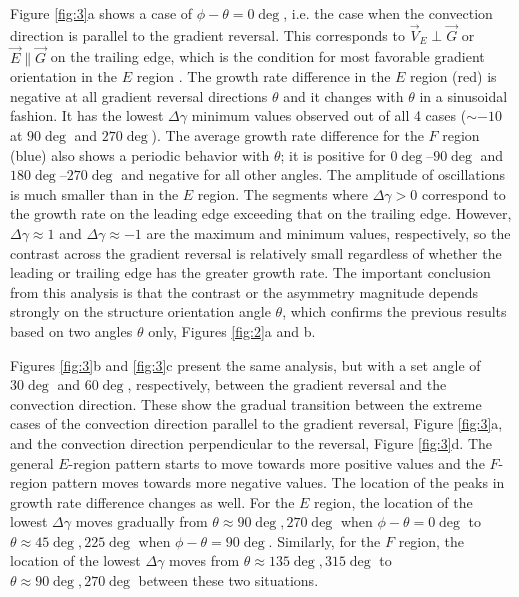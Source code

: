 Figure \ref{fig:3}a shows  a case of \(\phi-\theta=0\deg\), i.e. the case when the convection direction is parallel to the gradient reversal. This corresponds to \(\vec{V}_E \perp \vec{G}\) or \(\vec{E} \parallel \vec{G}\) on the trailing edge, which is the condition for most favorable gradient orientation in the \(E\) region \citep{Makarevich2014c}. The growth rate difference in the \(E\) region (red) is negative at all gradient reversal directions \(\theta\) and it changes with \(\theta\) in a sinusoidal fashion. It has the lowest \(\Delta\gamma\) minimum values observed out of all 4 cases (\(\sim-10\) at \(90\deg\) and \(270\deg\)). The average growth rate difference for the \(F\) region (blue) also shows a periodic behavior with \(\theta\); it is positive for \(0\deg\)--\(90\deg\) and \(180\deg\)--\(270\deg\) and negative for all other angles. The amplitude of oscillations is much smaller than in the \(E\) region. The segments where \(\Delta\gamma>0\) correspond to the growth rate on the leading edge exceeding that on the trailing edge. However, \(\Delta\gamma\approx 1\) and \(\Delta\gamma\approx -1\) are the maximum and minimum values, respectively, so the contrast across the gradient reversal is relatively small regardless of whether the leading or trailing edge has the greater growth rate. The important conclusion from this analysis is that the contrast or the asymmetry magnitude depends strongly on the structure orientation angle \(\theta\), which confirms the previous results based on two angles \(\theta\) only, Figures \ref{fig:2}a and b.


Figures \ref{fig:3}b and \ref{fig:3}c present the same analysis, but with a set angle of \(30\deg\) and \(60\deg\), respectively, between the gradient reversal and the convection direction.  These show the gradual transition between the extreme cases of the convection direction parallel to the gradient reversal, Figure \ref{fig:3}a, and the convection direction perpendicular to the reversal, Figure \ref{fig:3}d.  The general \(E\)-region pattern starts to move towards more positive values and the \(F\)-region pattern moves towards more negative values.  The location of the peaks in growth rate difference changes as well. For the \(E\) region, the location of the lowest \(\Delta\gamma\) moves gradually from \(\theta\approx 90\deg, 270\deg\) when \(\phi-\theta=0\deg\) to \(\theta\approx 45\deg, 225\deg\) when \(\phi-\theta=90\deg\). Similarly, for the \(F\) region, the location of the lowest \(\Delta\gamma\) moves from \(\theta\approx 135\deg, 315\deg\) to \(\theta\approx 90\deg, 270\deg\) between these two situations.

